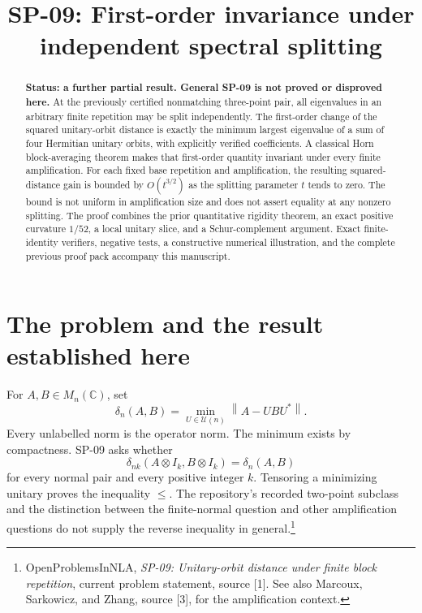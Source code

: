 \documentclass[11pt]{article}
\title{SP-09: First-order invariance under\\independent spectral splitting}
\author{}
\date{}
\theoremstyle{remark}\newtheorem{remark}[theorem]{Remark}
\newcommand{\C}{\mathbb C}
\newcommand{\U}{\mathcal U}
\newcommand{\dd}{\delta}
\newcommand{\norm}[1]{\left\lVert#1\right\rVert}
\begin{document}
\maketitle
\vspace{-1.5em}
\begin{abstract}
\noindent\textbf{Status: a further partial result. General SP-09 is not proved or disproved here.}
At the previously certified nonmatching three-point pair, all eigenvalues in an arbitrary finite repetition may be split independently. The first-order change of the squared unitary-orbit distance is exactly the minimum largest eigenvalue of a sum of four Hermitian unitary orbits, with explicitly verified coefficients. A classical Horn block-averaging theorem makes that first-order quantity invariant under every finite amplification. For each fixed base repetition and amplification, the resulting squared-distance gain is bounded by $O(t^{3/2})$ as the splitting parameter $t$ tends to zero. The bound is not uniform in amplification size and does not assert equality at any nonzero splitting. The proof combines the prior quantitative rigidity theorem, an exact positive curvature $1/52$, a local unitary slice, and a Schur-complement argument. Exact finite-identity verifiers, negative tests, a constructive numerical illustration, and the complete previous proof pack accompany this manuscript.
\end{abstract}

\section{The problem and the result established here}
For $A,B\in M_n(\C)$, set
\[
 \dd_n(A,B)=\min_{U\in\U(n)}\norm{A-UBU^*}.
\]
Every unlabelled norm is the operator norm. The minimum exists by compactness. SP-09 asks whether
\begin{equation}\label{eq:SP09}
 \dd_{nk}(A\otimes I_k,B\otimes I_k)=\dd_n(A,B)
\end{equation}
for every normal pair and every positive integer $k$. Tensoring a minimizing unitary proves the inequality $\le$. The repository's recorded two-point subclass and the distinction between the finite-normal question and other amplification questions do not supply the reverse inequality in general.\footnote{OpenProblemsInNLA, \emph{SP-09: Unitary-orbit distance under finite block repetition}, current problem statement, source [1]. See also Marcoux, Sarkowicz, and Zhang, source [3], for the amplification context.}
\end{document}
